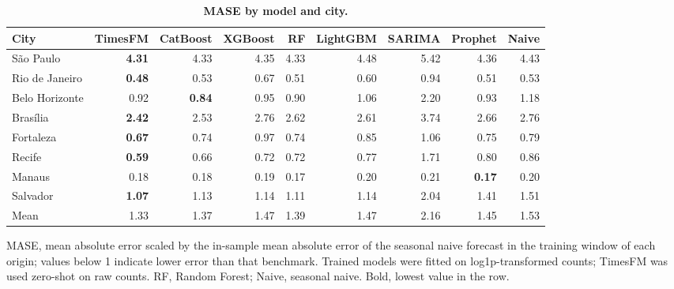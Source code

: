 
\begin{table}[!ht]
\centering
\small
\caption{\textbf{MASE by model and city.}}
\begin{tabular}{lrrrrrrrr}
\toprule
City & TimesFM & CatBoost & XGBoost & RF & LightGBM & SARIMA & Prophet & Naive \\
\midrule
S\~ao Paulo & \textbf{4.31} & 4.33 & 4.35 & 4.33 & 4.48 & 5.42 & 4.36 & 4.43 \\
Rio de Janeiro & \textbf{0.48} & 0.53 & 0.67 & 0.51 & 0.60 & 0.94 & 0.51 & 0.53 \\
Belo Horizonte & 0.92 & \textbf{0.84} & 0.95 & 0.90 & 1.06 & 2.20 & 0.93 & 1.18 \\
Bras\'ilia & \textbf{2.42} & 2.53 & 2.76 & 2.62 & 2.61 & 3.74 & 2.66 & 2.76 \\
Fortaleza & \textbf{0.67} & 0.74 & 0.97 & 0.74 & 0.85 & 1.06 & 0.75 & 0.79 \\
Recife & \textbf{0.59} & 0.66 & 0.72 & 0.72 & 0.77 & 1.71 & 0.80 & 0.86 \\
Manaus & 0.18 & 0.18 & 0.19 & 0.17 & 0.20 & 0.21 & \textbf{0.17} & 0.20 \\
Salvador & \textbf{1.07} & 1.13 & 1.14 & 1.11 & 1.14 & 2.04 & 1.41 & 1.51 \\
\midrule
Mean & 1.33 & 1.37 & 1.47 & 1.39 & 1.47 & 2.16 & 1.45 & 1.53 \\
\bottomrule
\end{tabular}
\begin{flushleft} MASE, mean absolute error scaled by the in-sample mean absolute error of the seasonal naive forecast in the training window of each origin; values below 1 indicate lower error than that benchmark. Trained models were fitted on log1p-transformed counts; TimesFM was used zero-shot on raw counts. RF, Random Forest; Naive, seasonal naive. Bold, lowest value in the row.
\end{flushleft}
\label{table3}
\end{table}
